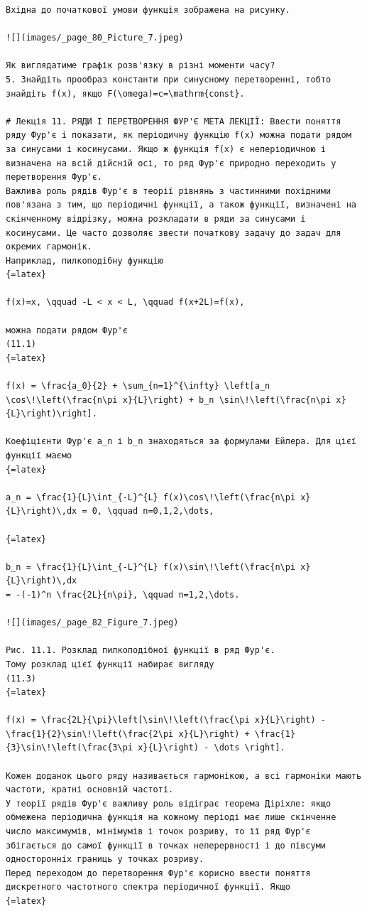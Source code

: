 \documentclass[
  ukrainian,
]{article}
\begin{document}
\begin{verbatim}
Вхідна до початкової умови функція зображена на рисунку.

![](images/_page_80_Picture_7.jpeg)

Як виглядатиме графік розв'язку в різні моменти часу?
5. Знайдіть прообраз константи при синусному перетворенні, тобто знайдіть f(x), якщо F(\omega)=c=\mathrm{const}.

# Лекція 11. РЯДИ І ПЕРЕТВОРЕННЯ ФУР'Є МЕТА ЛЕКЦІЇ: Ввести поняття ряду Фур'є і показати, як періодичну функцію f(x) можна подати рядом за синусами і косинусами. Якщо ж функція f(x) є неперіодичною і визначена на всій дійсній осі, то ряд Фур'є природно переходить у перетворення Фур'є.
Важлива роль рядів Фур'є в теорії рівнянь з частинними похідними пов'язана з тим, що періодичні функції, а також функції, визначені на скінченному відрізку, можна розкладати в ряди за синусами і косинусами. Це часто дозволяє звести початкову задачу до задач для окремих гармонік.
Наприклад, пилкоподібну функцію
{=latex}

f(x)=x, \qquad -L < x < L, \qquad f(x+2L)=f(x),

можна подати рядом Фур'є
(11.1)
{=latex}

f(x) = \frac{a_0}{2} + \sum_{n=1}^{\infty} \left[a_n \cos\!\left(\frac{n\pi x}{L}\right) + b_n \sin\!\left(\frac{n\pi x}{L}\right)\right].

Коефіцієнти Фур'є a_n і b_n знаходяться за формулами Ейлера. Для цієї функції маємо
{=latex}

a_n = \frac{1}{L}\int_{-L}^{L} f(x)\cos\!\left(\frac{n\pi x}{L}\right)\,dx = 0, \qquad n=0,1,2,\dots,

{=latex}

b_n = \frac{1}{L}\int_{-L}^{L} f(x)\sin\!\left(\frac{n\pi x}{L}\right)\,dx
= -(-1)^n \frac{2L}{n\pi}, \qquad n=1,2,\dots.

![](images/_page_82_Figure_7.jpeg)

Рис. 11.1. Розклад пилкоподібної функції в ряд Фур'є.
Тому розклад цієї функції набирає вигляду
(11.3)
{=latex}

f(x) = \frac{2L}{\pi}\left[\sin\!\left(\frac{\pi x}{L}\right) - \frac{1}{2}\sin\!\left(\frac{2\pi x}{L}\right) + \frac{1}{3}\sin\!\left(\frac{3\pi x}{L}\right) - \dots \right].

Кожен доданок цього ряду називається гармонікою, а всі гармоніки мають частоти, кратні основній частоті.
У теорії рядів Фур'є важливу роль відіграє теорема Діріхле: якщо обмежена періодична функція на кожному періоді має лише скінченне число максимумів, мінімумів і точок розриву, то її ряд Фур'є збігається до самої функції в точках неперервності і до півсуми односторонніх границь у точках розриву.
Перед переходом до перетворення Фур'є корисно ввести поняття дискретного частотного спектра періодичної функції. Якщо
{=latex}


\end{verbatim}
\end{document}
